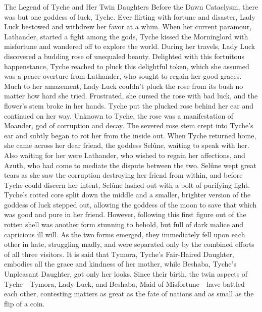 \documentclass[10pt,a4paper,twoside,twocolumn,openany,bg=print,nodeprecatedcode]{dndbook}
\begin{document}
\begin{DndComment}{The Legend of Tyche and Her Twin Daughters}
Before the Dawn Cataclysm, there was but one goddess of luck, Tyche. Ever flirting with fortune and disaster, Lady Luck bestowed and withdrew her favor at a whim. When her current paramour, Lathander, started a fight among the gods, Tyche kissed the Morninglord with misfortune and wandered off to explore the world.
During her travels, Lady Luck discovered a budding rose of unequaled beauty. Delighted with this fortuitous happenstance, Tyche reached to pluck this delightful token, which she assumed was a peace overture from Lathander, who sought to regain her good graces. Much to her amazement, Lady Luck couldn't pluck the rose from its bush no matter how hard she tried. Frustrated, she cursed the rose with bad luck, and the flower's stem broke in her hands. Tyche put the plucked rose behind her ear and continued on her way. Unknown to Tyche, the rose was a manifestation of Moander, god of corruption and decay. The severed rose stem crept into Tyche's ear and subtly began to rot her from the inside out.
When Tyche returned home, she came across her dear friend, the goddess Selûne, waiting to speak with her. Also waiting for her were Lathander, who wished to regain her affections, and Azuth, who had come to mediate the dispute between the two. Selûne wept great tears as she saw the corruption destroying her friend from within, and before Tyche could discern her intent, Selûne lashed out with a bolt of purifying light. Tyche's rotted core split down the middle and a smaller, brighter version of the goddess of luck stepped out, allowing the goddess of the moon to save that which was good and pure in her friend. However, following this first figure out of the rotten shell was another form stunning to behold, but full of dark malice and capricious ill will. As the two forms emerged, they immediately fell upon each other in hate, struggling madly, and were separated only by the combined efforts of all three visitors.
It is said that Tymora, Tyche's Fair-Haired Daughter, embodies all the grace and kindness of her mother, while Beshaba, Tyche's Unpleasant Daughter, got only her looks. Since their birth, the twin aspects of Tyche—Tymora, Lady Luck, and Beshaba, Maid of Misfortune—have battled each other, contesting matters as great as the fate of nations and as small as the flip of a coin.
\end{DndComment}
\end{document}
